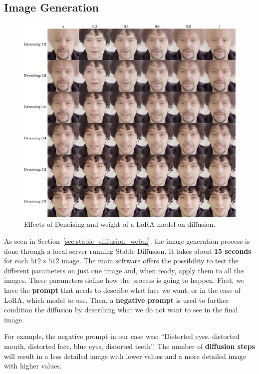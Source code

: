 \documentclass[preprint]{elsarticle}
\begin{document}
\subsection{Image Generation}

\begin{figure}[H]
	\centering
	\includegraphics[width=\textwidth, keepaspectratio]{img/project_img/grid-santini.png}
	\caption{Effects of Denoising and weight of a LoRA model on diffusion.}
	\label{fig:grid-santini}
\end{figure}


As seen in Section~\ref{sec:stable_diffusion_webui}, the image generation process is done through 
a local server running Stable Diffusion.  It takes about \textbf{15 seconds} for each $512 \times 512$ image.  The main software offers the possibility to test the different parameters  on just one image and, when ready, apply them to all the images.  These parameters define how the process is going to happen.
First, we have the \textbf{prompt} that needs to describe what face we want, or in the case of LoRA, 
which model to use.
Then, a \textbf{negative prompt} is used to further condition the diffusion by  describing what we do not want to see in the final image. 

For example, the negative prompt in our case was: ``Distorted eyes, distorted mouth, distorted face, blue eyes, distorted teeth''. The number of \textbf{diffusion steps} will result in a less detailed image with lower values and  a more detailed image with higher values. 
\end{document}
